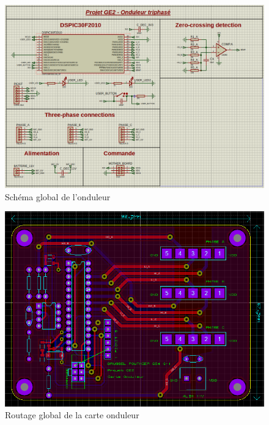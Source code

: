 		\begin{landscape}
		
		\begin{figure}
			\begin{center}
				\includegraphics[scale=0.6]{../Illus/bridge_gen_scheme.png}
			\end{center}
			\caption{Schéma global de l'onduleur}
			\label{bridge_gen_scheme}
		\end{figure}
		
		\newpage

		\begin{figure}
			\begin{center}
				\includegraphics[scale=1.1]{../Illus/bridge_gen_routing.png}
			\end{center}
			\caption{Routage global de la carte onduleur}
			\label{bridge_gen_routing}
		\end{figure}
		

\end{landscape}
